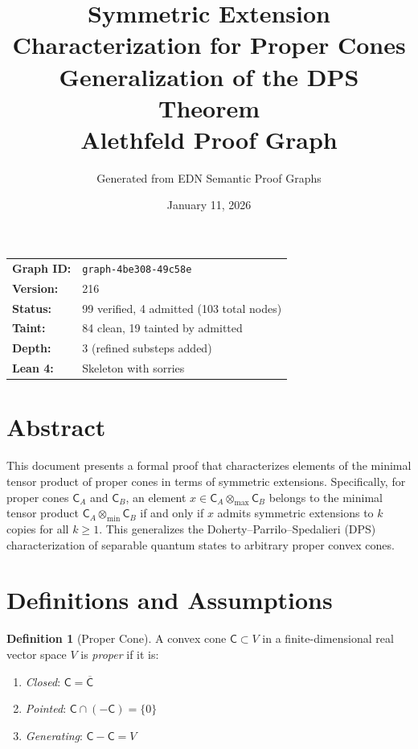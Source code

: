 \documentclass[11pt,a4paper]{article}
\title{\textbf{Symmetric Extension Characterization for Proper Cones}\\[0.3em]
{\normalsize Generalization of the DPS Theorem}\\[0.2em]
{\normalsize Alethfeld Proof Graph}}
\author{Generated from EDN Semantic Proof Graphs}
\date{January 11, 2026}
\theoremstyle{definition}
\newtheorem{definition}{Definition}[section]
\theoremstyle{plain}
\newcommand{\tmin}{{\otimes_{\min}}}
\newcommand{\tmax}{{\otimes_{\max}}}
\newcommand{\C}{\mathsf{C}}
\begin{document}
\maketitle

\begin{center}
\begin{tabular}{ll}
\textbf{Graph ID:} & \texttt{graph-4be308-49c58e} \\
\textbf{Version:} & 216 \\
\textbf{Status:} & 99 verified, 4 admitted (103 total nodes) \\
\textbf{Taint:} & 84 clean, 19 tainted by admitted \\
\textbf{Depth:} & 3 (refined substeps added) \\
\textbf{Lean 4:} & Skeleton with sorries \\
\end{tabular}
\end{center}

\section*{Abstract}

This document presents a formal proof that characterizes elements of the minimal tensor product of proper cones in terms of symmetric extensions. Specifically, for proper cones $\C_A$ and $\C_B$, an element $x \in \C_A \tmax \C_B$ belongs to the minimal tensor product $\C_A \tmin \C_B$ if and only if $x$ admits symmetric extensions to $k$ copies for all $k \geq 1$. This generalizes the Doherty--Parrilo--Spedalieri (DPS) characterization of separable quantum states to arbitrary proper convex cones.

\section{Definitions and Assumptions}

\begin{definition}[Proper Cone]
A convex cone $\C \subset V$ in a finite-dimensional real vector space $V$ is \emph{proper} if it is:
\begin{enumerate}
\item \emph{Closed}: $\C = \overline{\C}$
\item \emph{Pointed}: $\C \cap (-\C) = \{0\}$
\item \emph{Generating}: $\C - \C = V$
\end{enumerate}
\end{definition}
\end{document}
